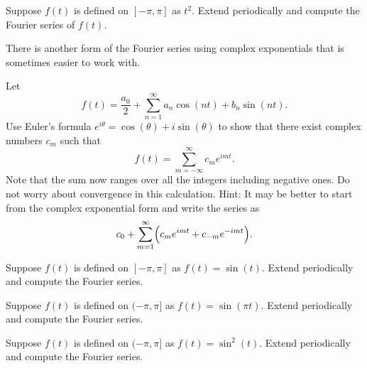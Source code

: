 \begin{exercise}
Suppose $f(t)$ is defined on $[-\pi,\pi]$ as $t^2$.
Extend periodically and compute the Fourier series of $f(t)$.
\end{exercise}

There is another form of the Fourier series using complex exponentials
that is sometimes easier to work with.

\begin{exercise}
Let 
\begin{equation*}
f(t) = \frac{a_0}{2} + \sum_{n=1}^\infty a_n \cos (n t)
+ b_n \sin (n t) .
\end{equation*}
Use Euler's formula $e^{i\theta} = \cos (\theta) + i \sin (\theta)$ to
show that there exist complex numbers $c_m$ such that
\begin{equation*}
f(t) = 
\sum_{m=-\infty}^\infty c_m e^{imt} .
\end{equation*}
Note that the sum now ranges over all the integers including negative ones.
Do not worry about convergence in this calculation.
Hint: It may be better to start from the complex exponential form and write
the series as
\begin{equation*}
c_0 + \sum_{m=1}^\infty \Bigl( c_m e^{imt} + c_{-m} e^{-imt}  \Bigr).
\end{equation*}
\end{exercise}

\setcounter{exercise}{100}

\begin{exercise}
Suppose $f(t)$ is defined on $[-\pi,\pi]$ as $f(t) = \sin(t)$.  Extend
periodically and compute the Fourier series.
\end{exercise}

\begin{exercise}
Suppose $f(t)$ is defined on $(-\pi,\pi]$ as $f(t) = \sin(\pi t)$.  Extend
periodically and compute the Fourier series.
\end{exercise}

\begin{exercise}
Suppose $f(t)$ is defined on $(-\pi,\pi]$ as $f(t) = \sin^2(t)$.
Extend
periodically and compute the Fourier series.
\end{exercise}

